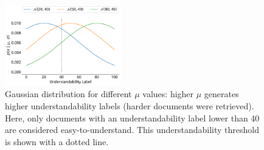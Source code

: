 %
%

\begin{figure}[t!]
  \centering
   \includegraphics[width=0.45\textwidth]{figs/gaussians}
    \vspace{-.2cm}
    \caption{Gaussian distribution for different $\mu$ values: higher $\mu$ generates higher understandability labels (harder documents were retrieved). Here, only documents with an understandability label lower than 40 are considered easy-to-understand. This understandability threshold is shown with a dotted line.}
  \label{fig:gaussians}
\end{figure}


